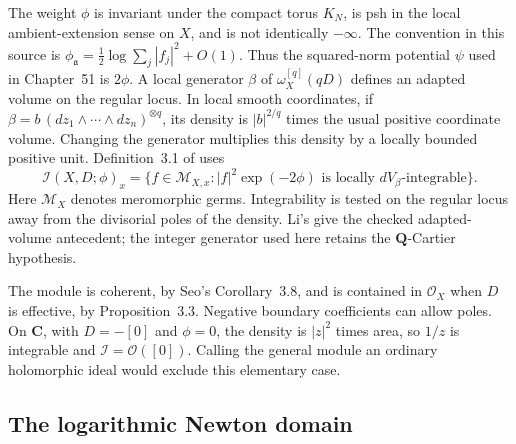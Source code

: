 The weight $\phi$ is invariant under the compact torus $K_N$, is psh
in the local ambient-extension sense on $X$, and is not identically
$-\infty$. The convention in this source is
$\phi_{\mathfrak a}=\tfrac12\log\sum_j|f_j|^2+O(1)$.
Thus the squared-norm potential $\psi$ used in Chapter~51 is $2\phi$.
A local generator $\beta$ of $\omega_X^{[q]}(qD)$ defines an adapted
volume on the regular locus. In local smooth coordinates, if
$\beta=b\,(dz_1\wedge\cdots\wedge dz_n)^{\otimes q}$, its density
is $|b|^{2/q}$ times the usual positive coordinate volume.
Changing the generator multiplies this density by a locally bounded
positive unit. Definition~3.1 of \cite{Seo26ToricMultiplierV1} uses
\begin{equation*}
 \mathcal I(X,D;\phi)_x
 =\{f\in\mathcal M_{X,x}:
       |f|^2\exp(-2\phi)\text{ is locally }dV_\beta\text{-integrable}\}.
\tag{H.63}\label{eq:appH-toric-adapted-module}
\end{equation*}
Here $\mathcal M_X$ denotes meromorphic germs. Integrability is tested
on the regular locus away from the divisorial poles of the density.
Li's \cite[Definition~2.2 and Remark~2.3, actual p.~3]{Li22KollarArchivedV1}
give the checked adapted-volume antecedent; the integer generator
used here retains the $\mathbf Q$-Cartier hypothesis.

The module is coherent, by Seo's Corollary~3.8, and is contained in
$\mathcal O_X$ when $D$ is effective, by Proposition~3.3. Negative
boundary coefficients can allow poles. On $\mathbf C$, with
$D=-[0]$ and $\phi=0$, the density is $|z|^2$ times area, so $1/z$
is integrable and $\mathcal I=\mathcal O([0])$. Calling the general
module an ordinary holomorphic ideal would exclude this elementary
case.

\subsection{The logarithmic Newton domain}
\label{sec:appH-toric-Newton-domain}

